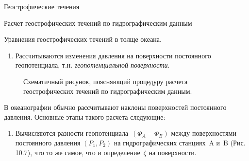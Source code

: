 \begin{chapter}{Геострофические течения}
\begin{section}{Расчет геострофических течений по гидрографическим данным}
\begin{paragraph}{Уравнения геострофических течений в толще океана.}
\begin{enumerate}
\item
Рассчитываются изменения давления на поверхности постоянного
геопотенциала, т.н. \emph{геопотенциальной поверхности}.
%
\end{enumerate}

\begin{figure}[h!]
\caption{Схематичный рисунок, поясняющий процедуру расчета
геострофических течений по гидрографическим данным.} 
\label{fig:hydrosketch}
\end{figure}
%
%

В океанографии обычно рассчитывают наклоны поверхностей постоянного
давления. Основные этапы такого расчета следующие:
%
\begin{enumerate}
\item
Вычисляются разности геопотенциала~$\left( \Phi_A - \Phi_B \right)$ 
между поверхностями постоянного давления $\left( P_1 , P_2 \right)$ 
на гидрографических станциях~A и~B (Рис. 10.7), что то же самое, 
что и определение~$\zeta$ на поверхности.
%


\end{enumerate}
\end{paragraph}
\end{section}
\end{chapter}
